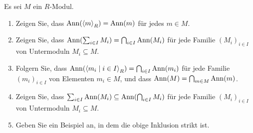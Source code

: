 \begin{question}[subtitle = Rechenregeln für Annihilatoren]
  Es sei $M$ ein $R$-Modul.
  \begin{enumerate}
    \item
      Zeigen Sie, dass $\operatorname{Ann}( \left\langle m \right\rangle_R ) = \operatorname{Ann}(m)$ für jedes $m \in M$.
    \item
      Zeigen Sie, dass $\operatorname{Ann}( \sum_{i \in I} M_i) = \bigcap_{i \in I} \operatorname{Ann}(M_i)$ für jede Familie $(M_i)_{i \in I}$ von Untermoduln $M_i \subseteq M$.
    \item
      Folgern Sie, dass $\operatorname{Ann}( \left\langle m_i \mid i \in I \right\rangle_R ) = \bigcap_{i \in I} \operatorname{Ann}(m_i)$ für jede Familie $(m_i)_{i \in I}$ von Elementen $m_i \in M$, und dass $\operatorname{Ann}(M) = \bigcap_{m \in M} \operatorname{Ann}(m)$.
    \item
      Zeigen Sie, dass $\sum_{i \in I} \operatorname{Ann}(M_i) \subseteq \operatorname{Ann}( \bigcap_{i \in I} M_i)$ für jede Familie $(M_i)_{i \in I}$ von Untermoduln $M_i \subseteq M$.
    \item
      Geben Sie ein Beispiel an, in dem die obige Inklusion strikt ist.
  \end{enumerate}
\end{question}


